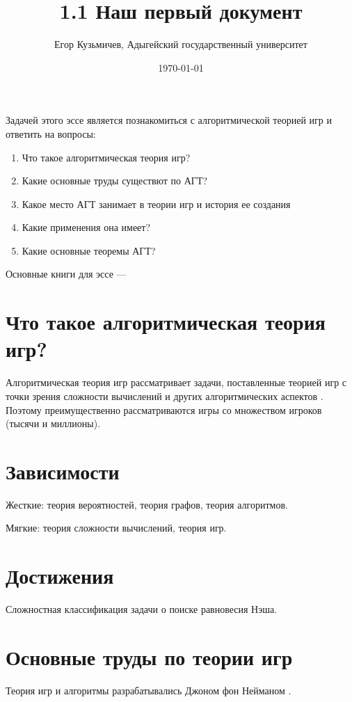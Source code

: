 \documentclass[a4paper,12pt]{article}
\author{Егор Кузьмичев, Адыгейский государственный университет}
\title{1.1 Наш первый документ}
\date{\today}
\begin{document}

\maketitle

Задачей этого эссе является познакомиться с алгоритмической теорией игр и ответить на вопросы:
\begin{enumerate}
\item Что такое алгоритмическая теория игр?
\item Какие основные труды существют по АГТ?
\item Какое место АГТ занимает в теории игр и история ее создания
\item Какие применения она имеет?
\item Какие основные теоремы АГТ?
\end{enumerate}

Основные книги для эссе --- \cite{agt}

\tableofcontents

\section{Что такое алгоритмическая теория игр?}

Алгоритмическая теория игр рассматривает задачи, поставленные теорией игр с точки зрения сложности вычислений и других алгоритмических аспектов \parencite{anons12}.
Поэтому преимущественно рассматриваются игры со множеством игроков (тысячи и миллионы). 

\section{Зависимости}

Жесткие: теория вероятностей, теория графов, теория алгоритмов.

Мягкие: теория сложности вычислений, теория игр.

\section{Достижения}

Сложностная классификация задачи о поиске равновесия Нэша.

\section{Основные труды по теории игр}
Теория игр и алгоритмы разрабатывались Джоном фон Нейманом \cite{neumann}.
\end{document}
